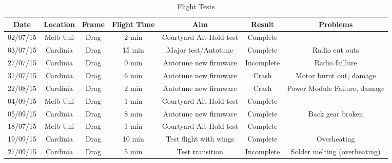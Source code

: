



\begin{table}[htbp]
	\centering
	\begin{tabular}{|c|c|c|c|c|c|c|}
		\hline Date & Location & Frame & Flight Time & Aim & Result & Problems \\ 
		\hline 02/07/15 & Melb Uni & Drag & 2 min & Courtyard Alt-Hold test & Complete & - \\ 
		\hline 03/07/15 & Cardinia & Drag & 15 min & Major test/Autotune & Complete & Radio cut outs \\ 
		\hline 27/07/15 & Cardinia  & Drag & 0 min & Autotune new firmware & Incomplete & Radio faillure \\ 
		\hline 31/07/15 & Cardinia  & Drag & 6 min & Autotune new firmware & Crash & Motor burnt out, damage  \\ 
		\hline 22/08/15 & Cardinia  & Drag & 2 min & Autotune new firmware & Crash & Power Module Failure, damage\\
		\hline 04/09/15 & Melb Uni & Drag & 1 min & Courtyard Alt-Hold test & Complete & - \\  
		\hline 05/09/15 & Cardinia  & Drag & 8 min & Autotune new firmware & Complete & Back gear broken\\
		\hline 18/07/15 & Melb Uni & Drag & 1 min & Courtyard Alt-Hold test & Complete & - \\  
		\hline 19/09/15 & Cardinia  & Drag & 10 min & Test flight with wings & Complete & Overheating \\ 
		\hline 27/09/15 & Cardinia  & Drag & 5 min & Test transition & Incomplete & Solder melting (overheating) \\ 
		\hline 
	\end{tabular} 
	\caption{Flight Tests}
	\label{tab:tests}
\end{table}


